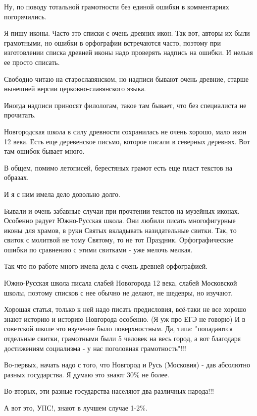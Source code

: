 \begin{itemize}

Ну, по поводу тотальной грамотности без единой ошибки в комментариях
погорячились.

Я пишу иконы. Часто это списки с очень древних икон. Так вот, авторы их были
грамотными, но ошибки в орфографии встречаются часто, поэтому при изготовлении
списка древней иконы надо проверять надпись на ошибки. И нельзя ее просто
списать.

Свободно читаю на старославянском, но надписи бывают очень древние, старше
нынешней версии церковно-славянского языка.

Иногда надписи приносят филологам, такое там бывает, что без специалиста не
прочитать.

Новгородская школа в силу древности сохранилась не очень хорошо, мало икон 12
века. Есть еще деревенское письмо, которое писали в северных деревнях. Вот там
ошибок бывает много.

В общем, помимо летописей, берестяных грамот есть еще пласт текстов на образах.

И я с ним имела дело довольно долго.

Бывали и очень забавные случаи при прочтении текстов на музейных иконах.
Особенно радует Южно-Русская школа. Они любили писать многофигурные иконы для
храмов, в руки Святых вкладывать назидательные свитки. Так, то свиток с
молитвой не тому Святому, то не тот Праздник. Орфографические ошибки по
сравнению с этими свитками - уже мелочь мелкая.

Так что по работе много имела дела с очень древней орфографией.

Южно-Русская школа писала слабей Новогорода 12 века, слабей Московской школы,
поэтому списков с нее обычно не делают, не шедевры, но изучают.


Хорошая статья, только к ней надо писать предисловия, всё-таки не все хорошо
знают историю и историю Новгорода особенно. (Я уж про ЕГЭ не говорю) И в
советской школе это изучение было поверхностным. Да, типа: "попадаются
отдельные свитки, грамотными были 5 человек на весь город, а вот благодаря
достижениям социализма - у нас поголовная грамотность"!!!

Во-первых, начать надо с того, что Новгород и Русь (Московия) - дав абсолютно
разных государства. Я думаю это знают 30\% не более.

Во-вторых, эти разные государства населяют два различных народа!!!

А вот это, УПС!, знают в лучшем случае 1-2\%.


\end{itemize}
